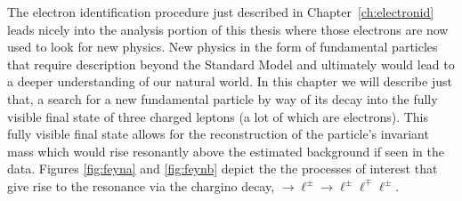 The electron identification procedure just described in Chapter~\ref{ch:electronid} leads nicely into the analysis portion of this thesis where those electrons are now used to look for new physics.
New physics in the form of fundamental particles that require description beyond the Standard Model and ultimately would lead to a deeper understanding of our natural world.
In this chapter we will describe just that, a search for a new fundamental particle by way of its decay into the fully visible final state of three charged leptons (a lot of which are electrons).
This fully visible final state allows for the reconstruction of the particle's invariant mass which would rise resonantly above the estimated background if seen in the data.
Figures \ref{fig:feyna} and \ref{fig:feynb} depict the the  processes of interest that give rise to the resonance via the chargino decay, \chonepm$\rightarrow$\Zboson$\ell^{\pm} \rightarrow  \ell^{\pm} \ell^{\mp} \ell^{\pm}$.
